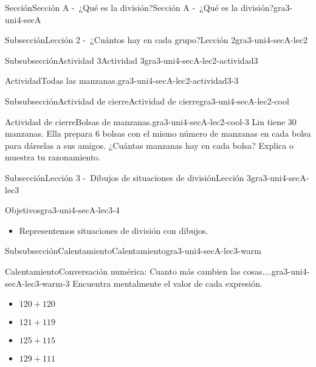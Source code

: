 \documentclass[twoside,10pt,]{article}
\begin{document}
\begin{sectionptx}{Sección}{Sección A -~¿Qué es la división?}{}{Sección A -~¿Qué es la división?}{}{}{gra3-uni4-secA}
\begin{subsectionptx}{Subsección}{Lección 2 -~¿Cuántos hay en cada grupo?}{}{Lección 2}{}{}{gra3-uni4-secA-lec2}
\begin{subsubsectionptx}{Subsubsección}{Actividad 3}{}{Actividad 3}{}{}{gra3-uni4-secA-lec2-actividad3}
\begin{activity}{Actividad}{Todas las manzanas.}{gra3-uni4-secA-lec2-actividad3-3}
\begin{itemize}[label=\textbullet]
\end{itemize}
%
\end{activity}%
\end{subsubsectionptx}
%
%
\typeout{************************************************}
\typeout{************************************************}
%
\begin{subsubsectionptx}{Subsubsección}{Actividad de cierre}{}{Actividad de cierre}{}{}{gra3-uni4-secA-lec2-cool}
\begin{project}{Actividad de cierre}{Bolsas de manzanas.}{gra3-uni4-secA-lec2-cool-3}%
Lin tiene 30 manzanas. Ella prepara 6 bolsas con el mismo número de manzanas en cada bolsa para dárselas a sus amigos. ¿Cuántas manzanas hay en cada bolsa? Explica o muestra tu razonamiento.%
\end{project}%
\end{subsubsectionptx}
\end{subsectionptx}
%
%
\typeout{************************************************}
\typeout{************************************************}
%
\begin{subsectionptx}{Subsección}{Lección 3 -~Dibujos de situaciones de división}{}{Lección 3}{}{}{gra3-uni4-secA-lec3}
\begin{objectives}{Objetivos}{gra3-uni4-secA-lec3-4}
%
\begin{itemize}[label=\textbullet]
\item{}Representemos situaciones de división con dibujos.%
\end{itemize}
\end{objectives}
%
%
\typeout{************************************************}
\typeout{************************************************}
%
\begin{subsubsectionptx}{Subsubsección}{Calentamiento}{}{Calentamiento}{}{}{gra3-uni4-secA-lec3-warm}
\begin{exploration}{Calentamiento}{Conversación numérica: Cuanto más cambien las cosas....}{gra3-uni4-secA-lec3-warm-3}%
Encuentra mentalmente el valor de cada expresión.%
\par
%
\begin{itemize}[label=\textbullet]
\item{}\(\displaystyle 120 + 120\)%
\item{}\(\displaystyle 121 + 119\)%
\item{}\(\displaystyle 125 + 115\)%
\item{}\(\displaystyle 129 + 111\)%

\end{itemize}
\end{exploration}
\end{subsubsectionptx}
\end{subsectionptx}
\end{sectionptx}
\end{document}
